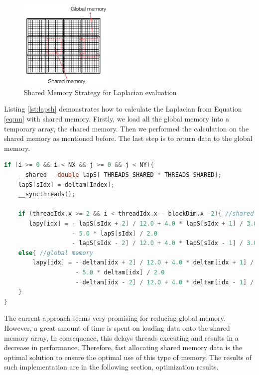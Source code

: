 \begin{figure}[htbp]
	\centering
		\includegraphics[width=0.4\textwidth]{Figures/shared.png}
		\smallskip
	\caption[Shared Memory Strategy]{Shared Memory Strategy for Laplacian evaluation }
	\label{fig:shared}
\end{figure}

Listing \ref{lst:lapsh} demonstrates how  to calculate the Laplacian from Equation \ref{eq:nn} with shared memory. Firstly, we load all the global memory into a temporary array, the shared memory. Then we performed the calculation on the shared memory as mentioned before. The last step is to return data to the global memory.

\begin{lstlisting}[language=C++, label={lst:lapsh}, caption={Laplacian evaluating using shared memory with boundaries condition}]
if (i >= 0 && i < NX && j >= 0 && j < NY){
    __shared__ double lapS[ THREADS_SHARED * THREADS_SHARED];
    lapS[sIdx] = deltam[Index];
    __syncthreads();

    if (threadIdx.x >= 2 && i < threadIdx.x - blockDim.x -2){ //shared
       lapy[idx] = - lapS[sIdx + 2] / 12.0 + 4.0 * lapS[sIdx + 1] / 3.0
			  	   - 5.0 * lapS[sIdx] / 2.0
			  	   - lapS[sIdx - 2] / 12.0 + 4.0 * lapS[sIdx - 1] / 3.0;
	else{ //global memory
		lapy[idx] = - deltam[idx + 2] / 12.0 + 4.0 * deltam[idx + 1] / 3.0
			  		- 5.0 * deltam[idx] / 2.0
			  		- deltam[idx - 2] / 12.0 + 4.0 * deltam[idx - 1] / 3.0;
	}
}
\end{lstlisting}

The current approach seems very promising for reducing global memory. However, a great amount of time is spent on loading data onto the shared memory array, In consequence, this delays threads executing and results in a decrease in performance. Therefore, fast allocating shared memory data is the optimal solution to ensure the optimal use of this type of memory. The results of such implementation are in the following section, optimization results.

